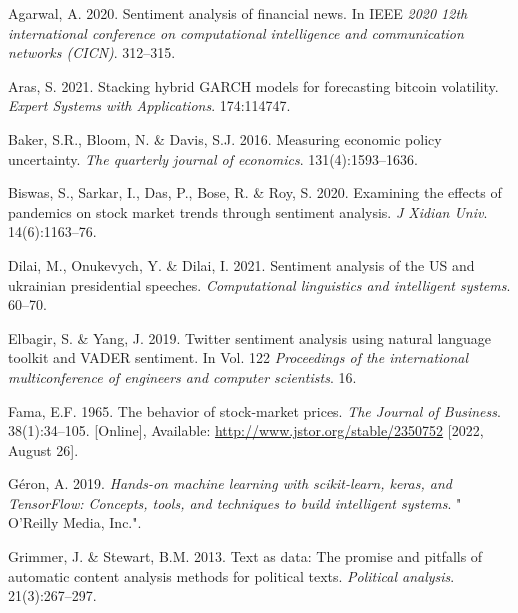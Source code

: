 \documentclass[11pt,preprint, authoryear]{elsarticle}
\numberwithin{equation}{section}
\numberwithin{figure}{section}
\numberwithin{table}{section}
\newlength{\cslhangindent}
\newenvironment{CSLReferences}%
  {\setlength{\parindent}{0pt}%
  \everypar{\setlength{\hangindent}{\cslhangindent}}\ignorespaces}%
  {\par}
\begin{document}
\hypertarget{refs}{}
\begin{CSLReferences}{1}{0}
\leavevmode{}%
Agarwal, A. 2020. Sentiment analysis of financial news. In IEEE
\emph{2020 12th international conference on computational intelligence
and communication networks (CICN)}. 312--315.

\leavevmode{}%
Aras, S. 2021. Stacking hybrid GARCH models for forecasting bitcoin
volatility. \emph{Expert Systems with Applications}. 174:114747.

\leavevmode{}%
Baker, S.R., Bloom, N. \& Davis, S.J. 2016. Measuring economic policy
uncertainty. \emph{The quarterly journal of economics}.
131(4):1593--1636.

\leavevmode{}%
Biswas, S., Sarkar, I., Das, P., Bose, R. \& Roy, S. 2020. Examining the
effects of pandemics on stock market trends through sentiment analysis.
\emph{J Xidian Univ}. 14(6):1163--76.

\leavevmode{}%
Dilai, M., Onukevych, Y. \& Dilai, I. 2021. Sentiment analysis of the US
and ukrainian presidential speeches. \emph{Computational linguistics and
intelligent systems}. 60--70.

\leavevmode{}%
Elbagir, S. \& Yang, J. 2019. Twitter sentiment analysis using natural
language toolkit and VADER sentiment. In Vol. 122 \emph{Proceedings of
the international multiconference of engineers and computer scientists}.
16.

\leavevmode{}%
Fama, E.F. 1965. The behavior of stock-market prices. \emph{The Journal
of Business}. 38(1):34--105. {[}Online{]}, Available:
\url{http://www.jstor.org/stable/2350752} {[}2022, August 26{]}.

\leavevmode{}%
Géron, A. 2019. \emph{Hands-on machine learning with scikit-learn,
keras, and TensorFlow: Concepts, tools, and techniques to build
intelligent systems}. " O'Reilly Media, Inc.".

\leavevmode{}%
Grimmer, J. \& Stewart, B.M. 2013. Text as data: The promise and
pitfalls of automatic content analysis methods for political texts.
\emph{Political analysis}. 21(3):267--297.


\end{CSLReferences}
\end{document}
